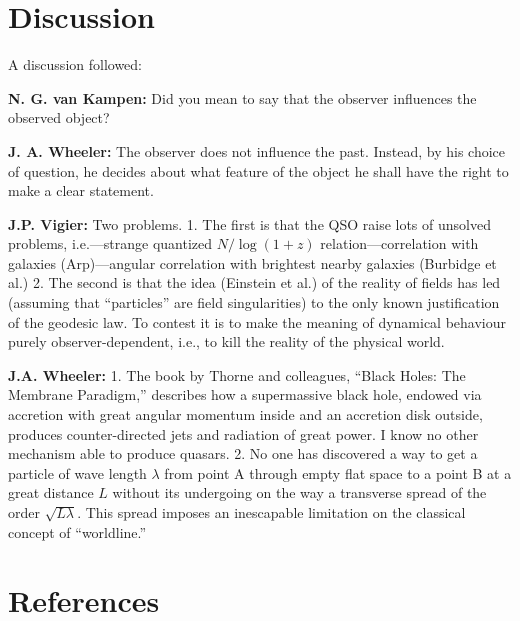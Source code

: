 \documentclass[11pt]{article}
\begin{document}
	\section*{Discussion}
	A discussion followed:
	
	\noindent\textbf{N. G. van Kampen:} Did you mean to say that the observer influences the observed object?
	
	\noindent\textbf{J. A. Wheeler:} The observer does not influence the past. Instead, by his choice of question, he decides about what feature of the object he shall have the right to make a clear statement.
	
	\noindent\textbf{J.P. Vigier:} Two problems.
	1. The first is that the QSO raise lots of unsolved problems, i.e.---strange quantized $N/\log(1+z)$ relation---correlation with galaxies (Arp)---angular correlation with brightest nearby galaxies (Burbidge et al.)
	2. The second is that the idea (Einstein et al.) of the reality of fields has led (assuming that ``particles'' are field singularities) to the only known justification of the geodesic law. To contest it is to make the meaning of dynamical behaviour purely observer-dependent, i.e., to kill the reality of the physical world.
	
	\noindent\textbf{J.A. Wheeler:}
	1. The book by Thorne and colleagues, ``Black Holes: The Membrane Paradigm,'' describes how a supermassive black hole, endowed via accretion with great angular momentum inside and an accretion disk outside, produces counter-directed jets and radiation of great power. I know no other mechanism able to produce quasars.
	2. No one has discovered a way to get a particle of wave length $\lambda$ from point A through empty flat space to a point B at a great distance $L$ without its undergoing on the way a transverse spread of the order $\sqrt{L\lambda}$. This spread imposes an inescapable limitation on the classical concept of ``worldline.''
	
	\section*{References}
	
\end{document}
